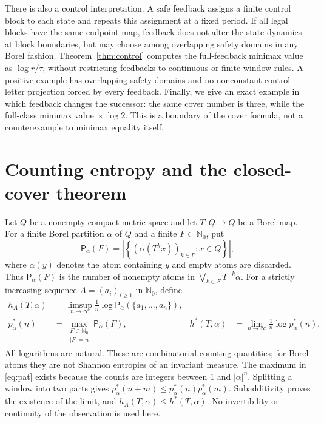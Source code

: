 \documentclass[11pt,reqno]{amsart}
\numberwithin{equation}{section}
\theoremstyle{definition}
\theoremstyle{remark}
\newcommand{\Nzero}{\mathbb N_0}
\newcommand{\Patt}{\mathsf P}
\newcommand{\hpat}{h^{*}}
\begin{document}
There is also a control interpretation. A safe feedback assigns a
finite control block to each state and repeats this assignment at a
fixed period. If all legal blocks have the same endpoint map, feedback
does not alter the state dynamics at block boundaries, but may choose
among overlapping safety domains in any Borel fashion. Theorem~\ref{thm:control}
computes the full-feedback minimax value as $\log r/\tau$, without
restricting feedbacks to continuous or finite-window rules. A positive
example has overlapping safety domains and no nonconstant control-letter
projection forced by every feedback. Finally, we give an exact example
in which feedback changes the successor: the same cover number is three,
while the full-class minimax value is $\log 2$. This is a boundary of the
cover formula, not a counterexample to minimax equality itself.

\section{Counting entropy and the closed-cover theorem}

Let $Q$ be a nonempty compact metric space and let $T:Q\to Q$ be a Borel
map. For a finite Borel partition $\alpha$ of $Q$ and a finite
$F\subset\Nzero$, put
\[
 \Patt_\alpha(F)=
 \left|\left\{(\alpha(T^k x))_{k\in F}:x\in Q\right\}\right|,
\]
where $\alpha(y)$ denotes the atom containing $y$ and empty atoms are
discarded. Thus $\Patt_\alpha(F)$ is the number of nonempty atoms in
$\bigvee_{k\in F}T^{-k}\alpha$. For a strictly increasing sequence
$A=(a_i)_{i\ge1}$ in $\Nzero$, define
\begin{align}
 h_A(T,\alpha)&=\limsup_{n\to\infty}\frac1n
       \log\Patt_\alpha(\{a_1,\ldots,a_n\}),\label{eq:seq}\\
 p_\alpha^*(n)&=\max_{\substack{F\subset\Nzero\\ |F|=n}}
                    \Patt_\alpha(F),
 &\hpat(T,\alpha)&=\lim_{n\to\infty}\frac1n\log p_\alpha^*(n).
 \label{eq:pat}
\end{align}
All logarithms are natural. These are combinatorial counting quantities;
for Borel atoms they are not Shannon entropies of an invariant measure.
The maximum in \eqref{eq:pat} exists because the counts are integers
between $1$ and $|\alpha|^n$. Splitting a window into two parts gives
$p_\alpha^*(n+m)\le p_\alpha^*(n)p_\alpha^*(m)$. Subadditivity proves the
existence of the limit, and $h_A(T,\alpha)\le\hpat(T,\alpha)$.
No invertibility or continuity of the observation is used here.
\end{document}
